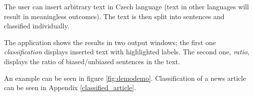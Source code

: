 The user can insert arbitrary text in Czech language (text in other languages will result in meaningless outcomes). The text is then split into sentences and classified individually.

The application shows the results in two output windows; the first one \textit{classification} displays inserted text with highlighted labels. The second one, \textit{ratio}, displays the ratio of biased/unbiased sentences in the text.

An example can be seen in figure \ref{fig:demodemo}. 
Classification of a news article can be seen in Appendix \ref{classified_article}.

\begin{figure}
\end{figure}



